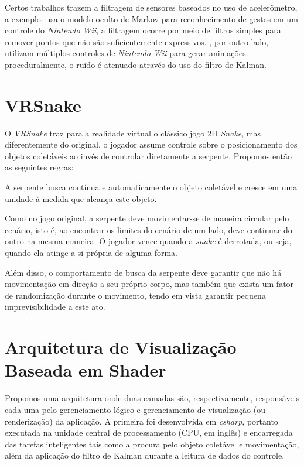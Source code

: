 \documentclass{vgtc}                          %
\begin{document}
Certos trabalhos trazem a filtragem de sensores baseados no uso de acelerômetro, a exemplo: \cite{schlomer2008gesture} usa o modelo oculto de Markov para reconhecimento de gestos em um controle do \textit{Nintendo Wii}, a filtragem ocorre por meio de filtros simples para remover pontos que não são suficientemente expressivos. \cite{shiratori2008accelerometer}, por outro lado, utilizam múltiplos controles de \textit{Nintendo Wii} para gerar animações proceduralmente, o ruído é atenuado através do uso do filtro de Kalman.

\section{VRSnake} \label{sec:vrsnake}
O \textit{VRSnake} traz para a realidade virtual o clássico jogo 2D \textit{Snake}, mas diferentemente do original, o jogador assume controle sobre o posicionamento dos objetos coletáveis ao invés de controlar diretamente a serpente. Propomos então as seguintes regras: 

A serpente busca contínua e automaticamente o objeto coletável e cresce em uma unidade à medida que alcança este objeto.

Como no jogo original, a serpente deve movimentar-se de maneira circular pelo cenário, isto é, ao encontrar os limites do cenário de um lado, deve continuar do outro na mesma maneira. O jogador vence quando a \textit{snake} é derrotada, ou seja, quando ela atinge a si própria de alguma forma.

Além disso, o comportamento de busca da serpente deve garantir que não há movimentação em direção a seu próprio corpo, mas também que exista um fator de randomização durante o movimento, tendo em vista garantir pequena imprevisibilidade a este ato.

\section{Arquitetura de Visualização Baseada em Shader} \label{sec:architecture}
Propomos uma arquitetura onde duas camadas são, respectivamente, responsáveis cada uma pelo gerenciamento lógico e gerenciamento de visualização (ou renderização) da aplicação. A primeira foi desenvolvida em \textit{csharp}, portanto executada na unidade central de processamento (CPU, em inglês) e encarregada das tarefas inteligentes tais como a procura pelo objeto coletável e movimentação, além da aplicação do filtro de Kalman durante a leitura de dados do controle.
\end{document}
